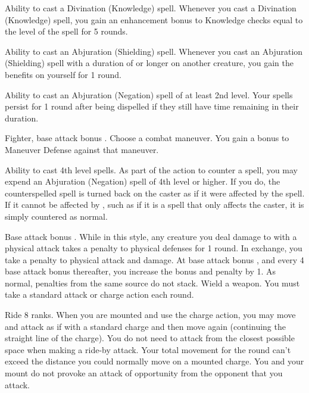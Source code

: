 \featpre Ability to cast a Divination (Knowledge) spell.
\featben Whenever you cast a Divination (Knowledge) spell, you gain an enhancement bonus to Knowledge checks equal to the level of the spell for 5 rounds.

\featpre Ability to cast an Abjuration (Shielding) spell.
\featben Whenever you cast an Abjuration (Shielding) spell with a duration of \durshort or longer on another creature, you gain the benefits on yourself for 1 round.

\featpre Ability to cast an Abjuration (Negation) spell of at least 2nd level.
\featben Your spells persist for 1 round after being dispelled if they still have time remaining in their duration.

\featpre Fighter, base attack bonus .
\featben Choose a combat maneuver. You gain a  bonus to Maneuver Defense against that maneuver.

 Ability to cast 4th level spells.
 As part of the action to counter a spell, you may expend an Abjuration (Negation) spell of 4th level or higher. If you do, the counterspelled spell is turned back on the caster as if it were affected by the  spell. If it cannot be affected by , such as if it is a spell that only affects the caster, it is simply countered as normal.

\featpre Base attack bonus .
 While in this style, any creature you deal damage to with a physical attack takes a  penalty to physical defenses for 1 round. In exchange, you take a  penalty to physical attack and damage. At base attack bonus , and every 4 base attack bonus thereafter, you increase the bonus and penalty by 1. As normal, penalties from the same source do not stack.
\stylereq Wield a weapon. You must take a standard attack or charge action each round.

\featpre Ride 8 ranks.
 When you are mounted and use the charge action, you may move and attack as if with a standard charge and then move again (continuing the straight line of the charge). You do not need to attack from the closest possible space when making a ride-by attack. Your total movement for the round can't exceed the distance you could normally move on a mounted charge. You and your mount do not provoke an attack of opportunity from the opponent that you attack.

